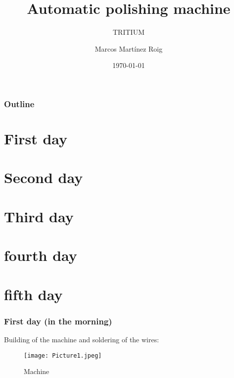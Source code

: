 \documentclass{beamer}
\title{Automatic polishing machine}
\subtitle{TRITIUM}
\author{Marcos Martínez Roig}
\institute{University of Valencia}
\date{\today}
\begin{document}
\begin{frame}
\titlepage
\end{frame}

\begin{frame}
\frametitle{Outline}
\tableofcontents
\end{frame}

\section{First day}
\section{Second day}
\section{Third day}
\section{fourth day}
\section{fifth day}


\begin{frame}
\frametitle{First day (in the morning)}
Building of the machine and soldering of the wires:
\begin{figure}[hbtp]
\centering
\texttt{[image: Picture1.jpeg]}
\caption{Machine}
\end{figure}
\end{frame}
\end{document}
